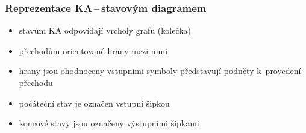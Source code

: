 \documentclass[hyperref={unicode}]{beamer}
\begin{document}
\begin{frame}
\transblindshorizontal
\frametitle{Reprezentace KA\,--\,stavovým diagramem}
\begin{alertblock}{}
\begin{itemize}
\item{stavům KA odpovídají vrcholy grafu (kolečka)}
\item{přechodům orientované hrany mezi nimi}
\item{hrany jsou ohodnoceny vstupními symboly představují podněty k~provedení přechodu}
\item{počáteční stav je označen vstupní šipkou}
\item{koncové stavy jsou označeny výstupními šipkami}
\end{itemize}
\end{alertblock}
\begin{figure}[h]
		\centering
\end{figure}
\end{frame}
\end{document}
